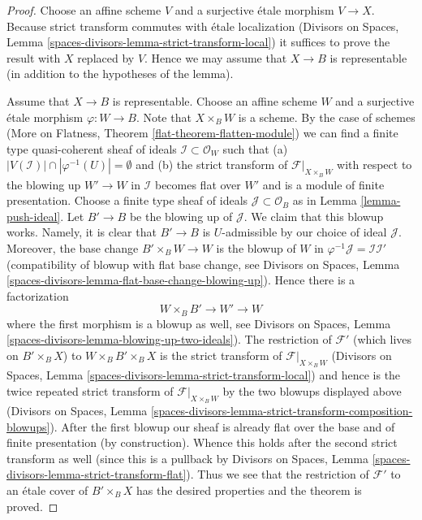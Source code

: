 \begin{proof}
Choose an affine scheme $V$ and a surjective \'etale morphism $V \to X$.
Because strict transform commutes with \'etale localization
(Divisors on Spaces, Lemma \ref{spaces-divisors-lemma-strict-transform-local})
it suffices to prove the result with $X$ replaced by $V$. Hence we
may assume that $X \to B$ is representable (in addition to the
hypotheses of the lemma).

\medskip\noindent
Assume that $X \to B$ is representable. Choose an affine scheme $W$ and a
surjective \'etale morphism $\varphi : W \to B$. Note that $X \times_B W$
is a scheme. By the case of schemes
(More on Flatness, Theorem \ref{flat-theorem-flatten-module})
we can find a finite type quasi-coherent sheaf of ideals
$\mathcal{I} \subset \mathcal{O}_W$ such that
(a) $|V(\mathcal{I})| \cap |\varphi^{-1}(U)| = \emptyset$ and (b)
the strict transform of $\mathcal{F}|_{X \times_B W}$ with respect
to the blowing up $W' \to W$ in $\mathcal{I}$ becomes flat over $W'$
and is a module of finite presentation. Choose a finite type sheaf of ideals
$\mathcal{J} \subset \mathcal{O}_B$ as in Lemma \ref{lemma-push-ideal}.
Let $B' \to B$ be the blowing up of $\mathcal{J}$. We claim that this
blowup works. Namely, it is clear that $B' \to B$ is $U$-admissible
by our choice of ideal $\mathcal{J}$. Moreover, the base change
$B' \times_B W \to W$ is the blowup of $W$ in
$\varphi^{-1}\mathcal{J} = \mathcal{I}\mathcal{I}'$
(compatibility of blowup with flat base change, see
Divisors on Spaces, Lemma
\ref{spaces-divisors-lemma-flat-base-change-blowing-up}).
Hence there is a factorization
$$
W \times_B B' \to W' \to W
$$
where the first morphism is a blowup as well, see
Divisors on Spaces, Lemma \ref{spaces-divisors-lemma-blowing-up-two-ideals}).
The restriction of $\mathcal{F}'$ (which lives on $B' \times_B X$)
to $W \times_B B' \times_B X$ is the strict transform of
$\mathcal{F}|_{X \times_B W}$
(Divisors on Spaces, Lemma \ref{spaces-divisors-lemma-strict-transform-local})
and hence is the twice repeated strict transform of
$\mathcal{F}|_{X \times_B W}$ by the two blowups displayed above
(Divisors on Spaces, Lemma
\ref{spaces-divisors-lemma-strict-transform-composition-blowups}).
After the first blowup our sheaf is already flat over
the base and of finite presentation (by construction). Whence this holds 
after the second strict transform as well (since this is a
pullback by Divisors on Spaces, Lemma
\ref{spaces-divisors-lemma-strict-transform-flat}).
Thus we see that the restriction of $\mathcal{F}'$
to an \'etale cover of $B' \times_B X$ has the desired properties
and the theorem is proved.
\end{proof}







